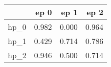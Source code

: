 \begin{tabular}{lrrr}
\toprule
{} &   ep 0 &   ep 1 &   ep 2 \\
\midrule
hp\_0 &  0.982 &  0.000 &  0.964 \\
hp\_1 &  0.429 &  0.714 &  0.786 \\
hp\_2 &  0.946 &  0.500 &  0.714 \\
\bottomrule
\end{tabular}
